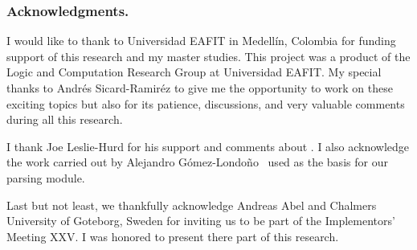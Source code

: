 \documentclass[../main.tex]{subfiles}
\begin{document}

\subsubsection*{Acknowledgments.}

I would like to thank to Universidad EAFIT in Medell\'in, Colombia for funding
support of this research and my master studies.
This project was a product of the Logic and Computation
Research Group at Universidad EAFIT.
My special thanks to Andrés Sicard-Ramiréz to give me the opportunity
to work on these exciting topics but also for its patience, discussions,
and very valuable comments during all this research.

I thank Joe Leslie-Hurd for his support and comments about \Metis.
I also acknowledge the work carried out by Alejandro
G\'omez-Londo\~no~\cite{Gomez-Londono2015} used as the basis
for our \TSTP parsing module.

Last but not least, we thankfully acknowledge
Andreas Abel and Chalmers University of Goteborg, Sweden for
inviting us to be part of the \Agda Implementors’ Meeting XXV.
I was honored to present there part of this research.
\end{document}
